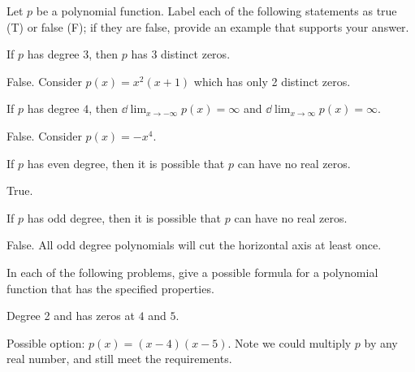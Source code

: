\begin{exercises}
	 \begin{problem}
	 Let $p$ be a polynomial function.
	 Label each of the following statements as true (T) or false (F); if they are false,
	 provide an example that supports your answer.
	 \begin{subproblem}
		 If $p$ has degree $3$, then $p$ has $3$ distinct zeros.
		 \begin{shortsolution}
			 False. Consider $p(x)=x^2(x+1)$ which has only 2 distinct zeros.
		 \end{shortsolution}
	 \end{subproblem}
	 \begin{subproblem}
		 If $p$ has degree $4$, then $\dd\lim_{x\rightarrow-\infty}p(x)=\infty$ and $\dd\lim_{x\rightarrow\infty}p(x)=\infty$.
		 \begin{shortsolution}
			 False. Consider $p(x)=-x^4$.
		 \end{shortsolution}
	 \end{subproblem}
	 \begin{subproblem}
		 If $p$ has even degree, then it is possible that $p$ can have no real zeros.
		 \begin{shortsolution}
			 True.
		 \end{shortsolution}
	 \end{subproblem}
	 \begin{subproblem}
		 If $p$ has odd degree, then it is possible that $p$ can have no real zeros.
		 \begin{shortsolution}
			 False. All odd degree polynomials will cut the horizontal axis at least once.
		 \end{shortsolution}
	 \end{subproblem}
	 \end{problem}
	 \begin{problem}
	 In each of the following problems, give a possible formula for a polynomial
	 function that has the specified properties.
	 \begin{subproblem}
		 Degree 2 and has zeros at $4$ and $5$.
		 \begin{shortsolution}
			 Possible option: $p(x)=(x-4)(x-5)$. Note we could multiply $p$ by any real number, and still meet the requirements.
		 \end{shortsolution}

\end{subproblem}
\end{problem}
\end{exercises}
